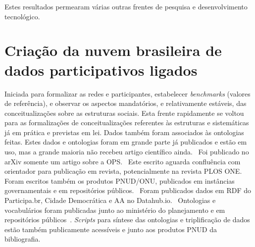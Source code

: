 \documentclass[a4paper,openright,12pt]{report} %
\begin{document}
Estes resultados permearam várias outras frentes 
de pesquisa e desenvolvimento tecnológico.~\cite{pnud3,pnud4,pnud5,ops,versinus}

\section{Criação da nuvem brasileira de dados participativos ligados}
Iniciada para formalizar as redes e participantes, estabelecer
\emph{benchmarks} (valores de referência), e observar
os aspectos mandatórios, e relativamente estáveis,
das conceitualizações sobre as estruturas sociais.
Esta frente rapidamente se voltou para
as formalizações de conceitualizações referentes às estruturas
e sistemáticas já em prática e previstas em lei.
Dados também foram associados às ontologias
feitas. Estes dados e ontologias foram em grande parte
já publicados e estão em uso, mas a grande maioria não
recebeu artigo científico ainda.~\cite{ops,pnud5,pnud4,pnud3,ensaio}
Foi publicado no arXiv somente um artigo sobre a OPS.~\cite{ops}
Este escrito aguarda confluência com orientador para publicação em revista, potencialmente na revista PLOS ONE.
Foram escritos também os produtos PNUD/ONU,
publicados em instâncias governamentais
e em repositórios públicos.~\cite{pnud3,pnud4,pnud5}
Foram publicados dados em RDF do Participa.br, Cidade
Democrática e AA no Datahub.io.~\cite{datahub}
Ontologias e vocabulários foram publicadas junto ao ministério do planejamento
e em repositórios públicos~\cite{pnud5}.
\emph{Scripts} para síntese das ontologias e triplificação
de dados estão também publicamente acessíveis
e junto aos produtos PNUD da bibliografia.
\end{document}
